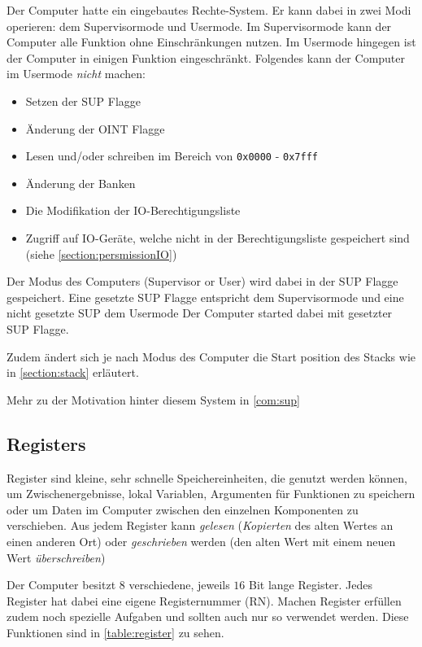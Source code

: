 \documentclass{scrartcl}
\begin{document}
Der Computer hatte ein eingebautes Rechte-System.
Er kann dabei in zwei Modi operieren: dem Supervisormode und Usermode.
Im Supervisormode kann der Computer alle Funktion ohne Einschränkungen nutzen.
Im Usermode hingegen ist der Computer in einigen Funktion eingeschränkt.
Folgendes kann der Computer im Usermode \emph{nicht} machen:

\begin{itemize}
	\item Setzen der SUP Flagge
	\item Änderung der OINT Flagge
	\item Lesen und/oder schreiben im Bereich von \texttt{0x0000} - \texttt{0x7fff}
	\item Änderung der Banken
	\item Die Modifikation der IO-Berechtigungsliste
	\item Zugriff auf IO-Geräte, welche nicht in der Berechtigungsliste gespeichert sind (siehe \autoref{section:persmissionIO})
\end{itemize}

Der Modus des Computers (Supervisor or User) wird dabei in der SUP Flagge gespeichert.
Eine gesetzte SUP Flagge entspricht dem Supervisormode und eine nicht gesetzte SUP dem Usermode Der Computer started dabei mit gesetzter SUP Flagge.

Zudem ändert sich je nach Modus des Computer die Start position des Stacks wie in \autoref{section:stack} erläutert.

Mehr zu der Motivation hinter diesem System in \autoref{com:sup}



\subsection{Registers}
Register sind kleine, sehr schnelle Speichereinheiten, die genutzt werden können, um Zwischenergebnisse, lokal Variablen, Argumenten für Funktionen zu speichern oder um Daten im Computer zwischen den einzelnen Komponenten zu verschieben.
Aus jedem Register kann \emph{gelesen} (\emph{Kopierten} des alten Wertes an einen anderen Ort) oder \emph{geschrieben} werden (den alten Wert mit einem neuen Wert \emph{überschreiben})

Der Computer besitzt $8$ verschiedene, jeweils $16$ Bit lange Register.
Jedes Register hat dabei eine eigene Registernummer (RN).
Machen Register erfüllen zudem noch spezielle Aufgaben und sollten auch nur so verwendet werden.
Diese Funktionen sind in \autoref{table:register} zu sehen.
\end{document}
